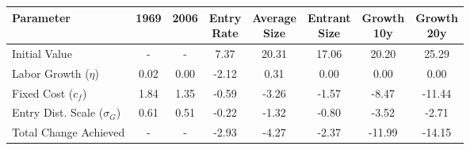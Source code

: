 \begin{tabular}{lccccccc}
\toprule
Parameter & 1969 & 2006 & \thead{Entry\\Rate} & \thead{Average\\Size} & \thead{Entrant\\Size} & \thead{Growth\\10y} & \thead{Growth\\20y} \\
\midrule
Initial Value & - & - & 7.37 & 20.31 & 17.06 & 20.20 & 25.29 \\
Labor Growth ($\eta$) & 0.02 & 0.00 & -2.12 & 0.31 & 0.00 & 0.00 & 0.00 \\
Fixed Cost ($c_f$) & 1.84 & 1.35 & -0.59 & -3.26 & -1.57 & -8.47 & -11.44 \\
Entry Dist. Scale ($\sigma_G$) & 0.61 & 0.51 & -0.22 & -1.32 & -0.80 & -3.52 & -2.71 \\
Total Change Achieved & - & - & -2.93 & -4.27 & -2.37 & -11.99 & -14.15 \\
\bottomrule
\end{tabular}
